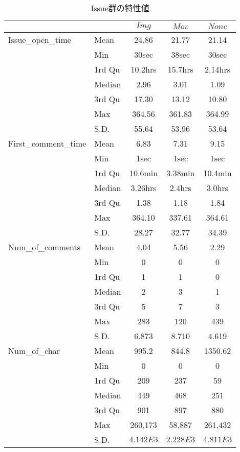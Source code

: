 \begin{table}[t]
  \begin{center}
  \caption{Issue群の特性値}
  \renewcommand{\arraystretch}{1.3}
  \begin{tabular}{l l c c c } 
      \hline
       & & \textbf{$Img$} & \textbf{$Mov$} & \textbf{$None$} \\ 
      \hline
      Issue\_open\_time & Mean & 24.86 & 21.77 & 21.14 \\
       & Min & 30sec & 38sec & 30sec \\
       & 1rd Qu & 10.2hrs & 15.7hrs & 2.14hrs \\
       & Median & 2.96 & 3.01 & 1.09 \\
       & 3rd Qu & 17.30 & 13.12 & 10.80 \\
       & Max & 364.56 & 361.83 & 364.99 \\
       & S.D. & 55.64 & 53.96 & 53.64 \\
      \hline
      First\_comment\_time & Mean & 6.83 & 7.31 & 9.15 \\
      & Min & 1sec & 1sec & 1sec \\
      & 1rd Qu & 10.6min & 3.38min & 10.4min \\
      & Median & 3.26hrs & 2.4hrs & 3.0hrs \\
      & 3rd Qu & 1.38 & 1.18 & 1.84 \\
      & Max & 364.10 & 337.61 & 364.61 \\
      & S.D. & 28.27 & 32.77 & 34.39 \\
      \hline
      Num\_of\_comments & Mean & 4.04 & 5.56 & 2.29 \\
      & Min & 0 & 0 & 0 \\
      & 1rd Qu & 1 & 1 & 0 \\
      & Median & 2 & 3 & 1 \\
      & 3rd Qu & 5 & 7 & 3 \\
      & Max & 283 & 120 & 439 \\
      & S.D. & 6.873 & 8.710 & 4.619 \\
      \hline
      Num\_of\_char & Mean & 995.2 & 844.8 & 1350.62 \\
       & Min & 0 & 0 & 0 \\
       & 1rd Qu & 209 & 237 & 59 \\
       & Median & 449 & 468 & 251 \\
       & 3rd Qu & 901 & 897 & 880 \\
       & Max & 260,173 & 58,887 & 261,432 \\
       & S.D. & $4.142E3$ & $2.228E3$ & $4.811E3$ \\
      \hline
  \end{tabular}
  \label{issue_class_data}
  \end{center}
\end{table}